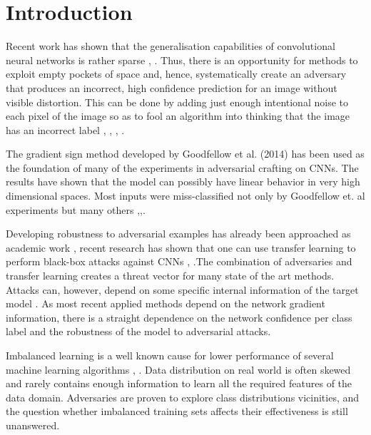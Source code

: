 \documentclass[runningheads,a4paper]{llncs}
\begin{document}
\section{Introduction}

Recent work has shown that the generalisation capabilities of convolutional neural networks \cite{lawrence1997face} is rather sparse \cite{goodfellow2016}, \cite{papernot2016transf}. Thus, there is an opportunity for methods to exploit empty pockets of space and, hence, systematically create an adversary that produces an incorrect, high confidence prediction for an image without visible distortion. This can be done by adding just enough intentional noise to each pixel of the image so as to fool an algorithm into thinking that the image has an incorrect label \cite{goodfellow2014}, \cite{goodfellow2016}, \cite{papernot2016transf}, \cite{szegedy2013}.

The gradient sign method developed by Goodfellow et al. (2014) has been used as the foundation of many of the experiments in adversarial crafting on CNNs. The results have shown that the model can possibly have linear behavior in very high dimensional spaces.  Most inputs were miss-classified not only by Goodfellow et. al \cite{goodfellow2014}  experiments but many others \cite{billovits},\cite{goodfellow2016},\cite{papernot2016}.

Developing robustness to adversarial examples has already been approached as academic work \cite{billovits}, recent research has shown that one can use transfer learning to perform black-box attacks against CNNs \cite{yosinski2014transferable} , \cite{papernot2016} .The combination of adversaries and transfer learning creates a threat vector for many state of the art methods. Attacks can, however, depend on some specific internal information of the target model \cite{papernot2016transf}. As most recent applied methods depend on the network gradient information, there is a straight dependence on the network confidence per class label and the robustness of the model to adversarial attacks.

Imbalanced learning is a well known cause for lower performance of several machine learning algorithms \cite{japkowicz2002class}, \cite{krawczyk2016learning}. Data distribution on real world is often skewed and rarely contains enough information to learn all the required features of the data domain. Adversaries are proven to explore class distributions vicinities, and the question whether imbalanced training sets affects their effectiveness is still unanswered.
\end{document}
